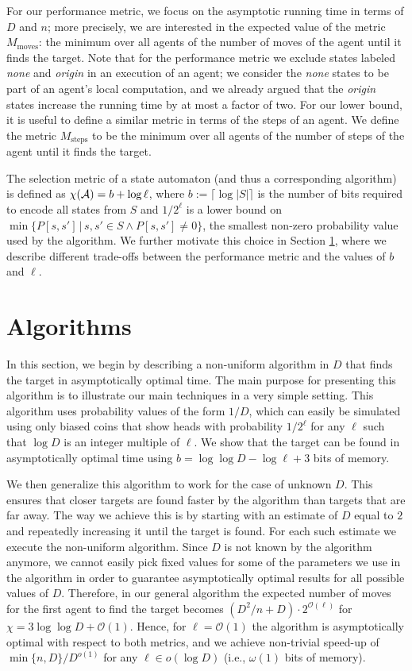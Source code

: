 \documentclass[11pt]{article}
\newcommand{\BO}{\mathcal{O}}
\begin{document}
For our performance metric, we focus on the asymptotic running time in terms of $D$ and $n$; more precisely, we are interested in the expected value of the metric $M_{\text{moves}}$: the minimum over all agents of the number of moves of the agent until it finds the target. Note that for the performance metric we exclude states labeled \emph{none} and \emph{origin} in an execution of an agent; we consider the \emph{none} states to be part of an agent's local computation, and we already argued that the \emph{origin} states increase the running time by at most a factor of two. For our lower bound, it is useful to define a similar metric in terms of the steps of an agent. We define the metric $M_{\text{steps}}$ to be the minimum over all agents of the number of steps of the agent until it finds the target.

The selection metric of a state automaton (and thus a corresponding algorithm) is defined as $\chi({\cal A}) = b + \log \ell$, where $b:=\lceil\log |S|\rceil$ is the number of bits required to encode all states from $S$ and $1/2^{\ell}$ is a lower bound on $\min\{P[s,s']\,|\,s,s'\in S\wedge P[s,s']\neq 0\}$, the smallest non-zero probability value used by the algorithm. We further motivate this choice in Section \ref{sec:upper}, where we describe different trade-offs between the performance metric and the values of $b$ and $\ell$.

\section{Algorithms}
\label{sec:upper}
In this section, we begin by describing a non-uniform algorithm in $D$ that finds the target in asymptotically optimal time. The main purpose for presenting this algorithm is to illustrate our main techniques in a very simple setting. This algorithm uses probability values of the form $1/D$, which can easily be simulated using only biased coins that show heads with probability $1/2^\ell$ for any $\ell$ such that $\log D$ is an integer multiple of $\ell$. We show that the target can be found in asymptotically optimal time using $b = \log \log D - \log \ell + 3$ bits of memory. 

We then generalize this algorithm to work for the case of unknown $D$. This ensures that closer targets are found faster by the algorithm than targets that are far away. The way we achieve this is by starting with an estimate of $D$ equal to $2$ and repeatedly increasing it until the target is found. For each such estimate we execute the non-uniform algorithm. Since $D$ is not known by the algorithm anymore, we cannot easily pick fixed values for some of the parameters we use in the algorithm in order to guarantee asymptotically optimal results for all possible values of $D$. Therefore, in our general algorithm the expected number of moves for the first agent to find the target becomes $(D^2/n + D) \cdot 2^{\BO(\ell)}$ for $\chi = 3 \log \log D + \BO(1)$. Hence, for $\ell=\BO(1)$ the algorithm is asymptotically optimal with respect to both metrics, and we achieve non-trivial speed-up of $\min\{n,D\}/D^{o(1)}$ for any $\ell\in o(\log D)$ (i.e., $\omega(1)$ bits of memory).
\end{document}
